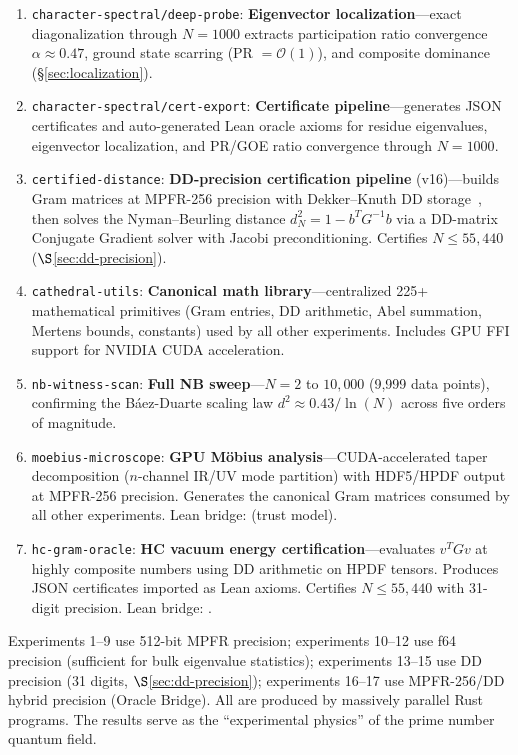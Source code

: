 \begin{enumerate}
    the Bott periodicity hypothesis (\S\ref{sec:universality}).
  \item \texttt{character-spectral/deep-probe}: \textbf{Eigenvector
    localization}---exact diagonalization through $N = 1000$ extracts
    participation ratio convergence $\alpha \approx 0.47$, ground state
    scarring (PR $= \mathcal{O}(1)$), and composite dominance
    (\S\ref{sec:localization}).
  \item \texttt{character-spectral/cert-export}: \textbf{Certificate
    pipeline}---generates JSON certificates and auto-generated Lean
    oracle axioms for residue eigenvalues, eigenvector localization,
    and PR/GOE ratio convergence through $N = 1000$.
  \item \texttt{certified-distance}: \textbf{DD-precision certification
    pipeline} (v16)---builds Gram matrices at MPFR-256 precision with
    Dekker--Knuth DD storage~\cite{dekker1971}, then solves the
    Nyman--Beurling distance $d_N^2 = 1 - b^T G^{-1} b$ via a DD-matrix
    Conjugate Gradient solver with Jacobi preconditioning. Certifies
    $N \leq 55{,}440$ ($\S$\ref{sec:dd-precision}).
  \item \texttt{cathedral-utils}: \textbf{Canonical math library}---centralized
    225+ mathematical primitives (Gram entries, DD arithmetic, Abel summation,
    Mertens bounds, constants) used by all other experiments. Includes
    GPU FFI support for NVIDIA CUDA acceleration.
  \item \texttt{nb-witness-scan}: \textbf{Full NB sweep}---$N = 2$ to $10{,}000$
    (9,999 data points), confirming the B\'aez-Duarte scaling law
    $d^2 \approx 0.43/\ln(N)$ across five orders of magnitude.
  \item \texttt{moebius-microscope}: \textbf{GPU M\"obius analysis}---CUDA-accelerated
    taper decomposition ($n$-channel IR/UV mode partition) with HDF5/HPDF
    output at MPFR-256 precision. Generates the canonical Gram matrices
    consumed by all other experiments. Lean bridge:
     (trust model).
  \item \texttt{hc-gram-oracle}: \textbf{HC vacuum energy certification}---evaluates
    $v^T G v$ at highly composite numbers using DD arithmetic on HPDF
    tensors. Produces JSON certificates imported as Lean axioms.
    Certifies $N \leq 55{,}440$ with 31-digit precision.
    Lean bridge: .
\end{enumerate}
Experiments 1--9 use 512-bit MPFR precision; experiments 10--12 use
f64 precision (sufficient for bulk eigenvalue statistics);
experiments 13--15 use DD precision (31 digits, $\S$\ref{sec:dd-precision});
experiments 16--17 use MPFR-256/DD hybrid precision (Oracle Bridge).
All are produced by massively parallel Rust programs.
The results serve as the ``experimental physics'' of the prime number
quantum field.

